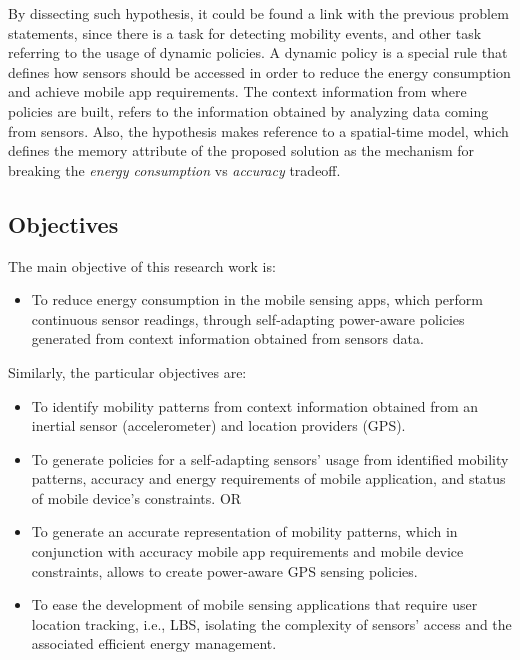 \documentclass[ENG,PhD]{cinvestav}
\begin{document}
By dissecting such hypothesis, it could be found a link with the previous problem statements, since there is a task for detecting mobility events, and other task referring to the usage of dynamic policies.
A dynamic policy is a special rule that defines how sensors should be accessed in order to reduce the energy consumption and achieve mobile app requirements. 
The context information from where policies are built, refers to the information obtained by analyzing data coming from sensors.
Also, the hypothesis makes reference to a spatial-time model, which defines the memory attribute of the proposed solution as the mechanism for breaking the \emph{energy consumption} vs \emph{accuracy} tradeoff.


\subsection{Objectives}
The main objective of this research work is:
\begin{itemize}
  \item To reduce energy consumption in the mobile sensing apps, which perform continuous sensor readings, through self-adapting power-aware policies generated from context information obtained from sensors data.
\end{itemize}

Similarly, the particular objectives are:
\begin{itemize}
  \item To identify mobility patterns from context information obtained from an inertial sensor (accelerometer) and location providers (GPS).
  \item To generate policies for a self-adapting sensors' usage from identified mobility patterns, accuracy and energy requirements of mobile application, and status of mobile device's constraints.  OR
  \item To generate an accurate representation of mobility patterns, which in conjunction with accuracy mobile app requirements and mobile device constraints, allows to create power-aware GPS sensing policies.
  \item To ease the development of mobile sensing applications that require user location tracking, i.e., LBS, isolating the complexity of sensors' access and the associated efficient energy management.
\end{itemize}
\end{document}
